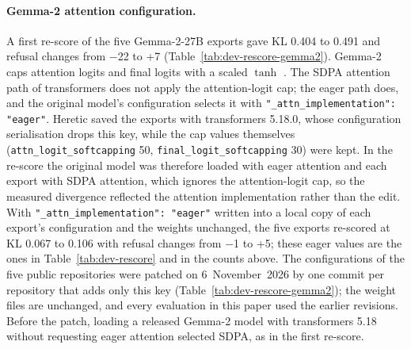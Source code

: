 \paragraph{Gemma-2 attention configuration.} A first re-score of the five
Gemma-2-27B exports gave KL 0.404 to 0.491 and refusal changes from $-$22 to
+7 (Table~\ref{tab:dev-rescore-gemma2}). Gemma-2 caps attention logits and
final logits with a scaled $\tanh$ \cite{gemmateam2024gemma2}. The SDPA
attention path of transformers does not apply the attention-logit cap; the
eager path does, and the original model's configuration selects it with
\texttt{"\_attn\_implementation": "eager"}. Heretic saved the exports with
transformers 5.18.0, whose configuration serialisation drops this key, while the
cap values themselves (\texttt{attn\_logit\_softcapping} 50,
\texttt{final\_logit\_softcapping} 30) were kept. In the re-score the original
model was therefore loaded with eager attention and each export with SDPA
attention, which ignores the attention-logit cap, so the measured divergence
reflected the attention implementation rather than the edit. With
\texttt{"\_attn\_implementation": "eager"} written into a local copy of each
export's configuration and the weights unchanged, the five exports re-scored at
KL 0.067 to 0.106 with refusal changes from $-$1 to +5; these eager values are
the ones in Table~\ref{tab:dev-rescore} and in the counts above. The
configurations of the five public repositories were patched on 6~November~2026
by one commit per repository that adds only this key
(Table~\ref{tab:dev-rescore-gemma2}); the weight files are unchanged, and every
evaluation in this paper used the earlier revisions. Before the patch, loading
a released Gemma-2 model with transformers 5.18 without requesting eager
attention selected SDPA, as in the first re-score.
